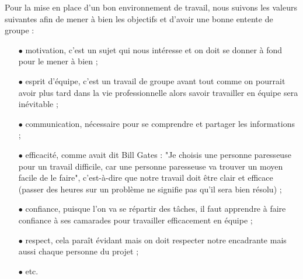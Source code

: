 Pour la mise en place d'un bon environnement de travail, nous suivons les valeurs suivantes afin de mener à bien les objectifs et d'avoir une bonne entente de groupe :
\begin{itemize}
\item[$\bullet$] motivation, c'est un sujet qui nous intéresse et on doit se donner à fond pour le mener à bien ;
\item[$\bullet$] esprit d’équipe, c'est un travail de groupe avant tout comme on pourrait avoir plus tard dans la vie professionnelle alors savoir travailler en équipe sera inévitable ;
\item[$\bullet$] communication, nécessaire pour se comprendre et partager les informations ;
\item[$\bullet$] efficacité, comme avait dit Bill Gates : "Je choisis une personne paresseuse pour un travail difficile, car une personne paresseuse va trouver un moyen facile de le faire", c'est-à-dire que notre travail doit être clair et efficace (passer des heures sur un problème ne signifie pas qu'il sera bien résolu) ;
\item[$\bullet$] confiance, puisque l'on va se répartir des tâches, il faut apprendre à faire confiance à ses camarades pour travailler efficacement en équipe ;
\item[$\bullet$] respect, cela paraît évidant mais on doit respecter notre encadrante mais aussi chaque personne du projet ;
\item[$\bullet$] etc.
\end{itemize}